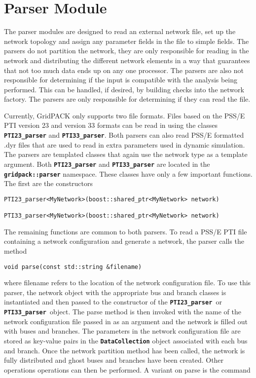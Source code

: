 \section{Parser Module}

The parser modules are designed to read an external network file, set up the network topology and assign any parameter fields in the file to simple fields. The parsers do not partition the network, they are only responsible for reading in the network and distributing the different network elements in a way that guarantees that not too much data ends up on any one processor. The parsers are also not responsible for determining if the input is compatible with the analysis being performed. This can be handled, if desired, by building checks into the network factory. The parsers are only responsible for determining if they can read the file.

Currently, GridPACK only supports two file formats. Files based on the PSS/E PTI version 23 and version 33 formats can be read in using the classes \texttt{\textbf{PTI23\_parser}} and \texttt{\textbf{PTI33\_parser}}. Both parsers can also read PSS/E formatted .dyr files that are used to read in extra parameters used in dynamic simulation. The parsers are templated classes that again use the network type as a template argument. Both \texttt{\textbf{PTI23\_parser}} and \texttt{\textbf{PTI33\_parser}} are located in the \texttt{\textbf{gridpack::parser}} namespace. These classes have only a few important functions. The first are the constructors

{
\color{red}
\begin{Verbatim}[fontseries=b]
PTI23_parser<MyNetwork>(boost::shared_ptr<MyNetwork> network)

PTI33_parser<MyNetwork>(boost::shared_ptr<MyNetwork> network)
\end{Verbatim}
}

The remaining functions are common to both parsers. To read a PSS/E PTI file containing a network configuration and generate a network, the parser calls the method

{
\color{red}
\begin{Verbatim}[fontseries=b]
void parse(const std::string &filename)
\end{Verbatim}
}

where filename refers to the location of the network configuration file. To use this parser, the network object with the appropriate bus and branch classes is instantiated and then passed to the constructor of the \texttt{\textbf{PTI23\_parser }}or\texttt{\textbf{ PTI33\_parser }}object. The parse method is then invoked with the name of the network configuration file passed in as an argument and the network is filled out with buses and branches. The parameters in the network configuration file are stored as key-value pairs in the \texttt{\textbf{DataCollection}} object associated with each bus and branch. Once the network partition method has been called, the network is fully distributed and ghost buses and branches have been created. Other operations operations can then be performed. A variant on parse is the command


